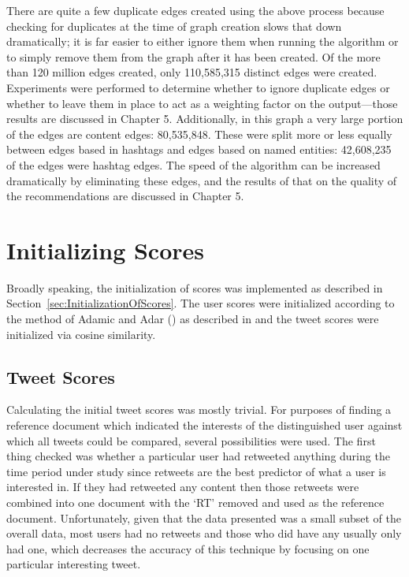 There are quite a few duplicate edges created using the above process because checking for duplicates at the time of graph creation slows that down dramatically; it is far easier to either ignore them when running the algorithm or to simply remove them from the graph after it has been created. Of the more than 120 million edges created, only  110,585,315 distinct edges were created. Experiments were performed to determine whether to ignore duplicate edges or whether to leave them in place to act as a weighting factor on the output---those results are discussed in Chapter 5. Additionally, in this graph a very large portion of the edges are content edges: 80,535,848. These were split more or less equally between edges based in hashtags and edges based on named entities:  42,608,235 of the edges were hashtag edges. The speed of the algorithm can be increased dramatically by eliminating these edges, and the results of that on the quality of the recommendations are discussed in Chapter 5.


\section{Initializing Scores}
\label{sec:InitializingScores}

Broadly speaking, the initialization of scores was implemented as described in Section~\ref{sec:InitializationOfScores}. The user scores were initialized according to the method of Adamic and Adar (\cite{Adamic2003}) as described in \cite{LibenNowell2007} and the tweet scores were initialized via cosine similarity.

\subsection{Tweet Scores}

Calculating the initial tweet scores was mostly trivial. For purposes of finding a reference document which indicated the interests of the distinguished user against which all tweets could be compared, several possibilities were used. The first thing checked was whether a particular user had retweeted anything during the time period under study since retweets are the best predictor of what a user is interested in. If they had retweeted any content then those retweets were combined into one document with the `RT' removed and used as the reference document. Unfortunately, given that the data presented was a small subset of the overall data, most users had no retweets and those who did have any usually only had one, which decreases the accuracy of this technique by focusing on one particular interesting tweet.

